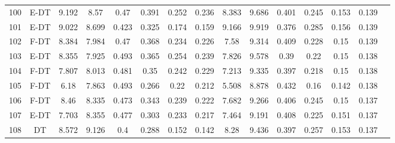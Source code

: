 \begin{longtable}{@{\hskip3pt}c@{\hskip3pt}c@{\hskip3pt}c@{\hskip3pt}c@{\hskip3pt}c@{\hskip3pt}c@{\hskip3pt}c@{\hskip3pt}c@{\hskip3pt}c@{\hskip3pt}c@{\hskip3pt}c@{\hskip3pt}c@{\hskip3pt}c@{\hskip3pt}c@{\hskip3pt}c}
        100 &           E-DT &             9.192 &           8.57 &            0.47 &           0.391 &           0.252 &           0.236 &               8.383 &           9.686 &           0.401 &         0.245 &          0.153 &           0.139 \\
        101 &           E-DT &             9.022 &          8.699 &           0.423 &           0.325 &           0.174 &           0.159 &               9.166 &           9.919 &           0.376 &         0.285 &          0.156 &           0.139 \\
        102 &           F-DT &             8.384 &          7.984 &            0.47 &           0.368 &           0.234 &           0.226 &                7.58 &           9.314 &           0.409 &         0.228 &           0.15 &           0.139 \\
        103 &           E-DT &             8.355 &          7.925 &           0.493 &           0.365 &           0.254 &           0.239 &               7.826 &           9.578 &            0.39 &          0.22 &           0.15 &           0.138 \\
        104 &           F-DT &             7.807 &          8.013 &           0.481 &            0.35 &           0.242 &           0.229 &               7.213 &           9.335 &           0.397 &         0.218 &           0.15 &           0.138 \\
        105 &           F-DT &              6.18 &          7.863 &           0.493 &           0.266 &            0.22 &           0.212 &               5.508 &           8.878 &           0.432 &          0.16 &          0.142 &           0.138 \\
        106 &           F-DT &              8.46 &          8.335 &           0.473 &           0.343 &           0.239 &           0.222 &               7.682 &           9.266 &           0.406 &         0.245 &           0.15 &           0.137 \\
        107 &           E-DT &             7.703 &          8.355 &           0.477 &           0.303 &           0.233 &           0.217 &               7.464 &           9.191 &           0.408 &         0.225 &          0.151 &           0.137 \\
        108 &             DT &             8.572 &          9.126 &             0.4 &           0.288 &           0.152 &           0.142 &                8.28 &           9.436 &           0.397 &         0.257 &          0.153 &           0.137 \\

\end{longtable}
